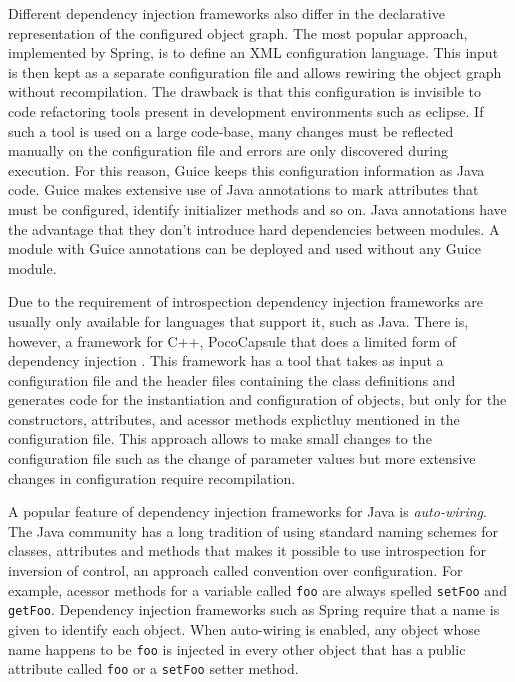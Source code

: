 Different dependency injection frameworks also differ in the declarative representation of the configured object graph.
The most popular approach, implemented by Spring, is to define an XML configuration language. This input is then
kept as a separate configuration file and allows rewiring the object graph without recompilation. The drawback
is that this configuration is invisible to code refactoring tools present in development environments such as eclipse.
If such a tool is used on a large code-base, many changes must be reflected manually on the configuration file and
errors are only discovered during execution. For this reason, Guice keeps this configuration information as Java code.
Guice makes extensive use of Java annotations to mark attributes that must be configured, identify initializer methods
and so on. Java annotations have the advantage that they don't introduce hard dependencies between modules.
A module with Guice annotations can be deployed and used without any Guice module.

Due to the requirement of introspection dependency injection frameworks are usually only available for languages
that support it, such as Java. There is, however, a framework for C++, PocoCapsule that does a limited form of
dependency injection \cite{PocoCapsule}. This framework has a tool that takes as input a configuration file and
the header files containing the class definitions and generates code for the instantiation and configuration
of objects, but only for the constructors, attributes, and acessor methods explictluy mentioned in the configuration
file. This approach allows to make small changes to the configuration file such as the change of parameter values
but more extensive changes in configuration require recompilation.

A popular feature of dependency injection frameworks for Java is \emph{auto-wiring}. The Java community has a
long tradition of using standard naming schemes for classes, attributes and methods that makes it possible to
use introspection for inversion of control, an approach called convention over configuration. For example,
acessor methods for a variable called \texttt{foo} are always spelled \texttt{setFoo} and \texttt{getFoo}.
Dependency injection frameworks such as Spring require that a name is given to identify each object. When
auto-wiring is enabled, any object whose name happens to be \texttt{foo} is injected in every other object
that has a public attribute called \texttt{foo} or a \texttt{setFoo} setter method.

